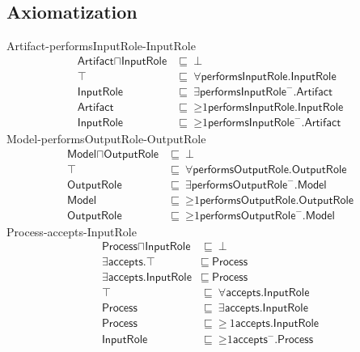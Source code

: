 \subsection{Axiomatization}
\label{axs:1a}
\textsf{Artifact}-\textsf{performsInputRole}-\textsf{InputRole}
\begin{align}
\textsf{Artifact} \sqcap \textsf{InputRole} &\sqsubseteq~\bot \\ %
\textsf{$\top$} &\sqsubseteq~\forall\textsf{performsInputRole.InputRole} \\ %
\textsf{InputRole} &\sqsubseteq~\exists\textsf{performsInputRole}^-\textsf{.Artifact} \\ %
\textsf{Artifact} &\sqsubseteq~\mathord{\geq}1\textsf{performsInputRole.InputRole} \\ %
\textsf{InputRole} &\sqsubseteq~\mathord{\geq}1\textsf{performsInputRole}^-\textsf{.Artifact} %
\end{align}
\textsf{Model}-\textsf{performsOutputRole}-\textsf{OutputRole}
\begin{align}
    \textsf{Model} \sqcap \textsf{OutputRole} &\sqsubseteq~\bot \\ %
    \textsf{$\top$} &\sqsubseteq~\forall\textsf{performsOutputRole.OutputRole} \\ %
    \textsf{OutputRole} &\sqsubseteq~\exists\textsf{performsOutputRole}^-\textsf{.Model} \\ %
    \textsf{Model} &\sqsubseteq~\mathord{\geq}1\textsf{performsOutputRole.OutputRole} \\ %
    \textsf{OutputRole} &\sqsubseteq~\mathord{\geq}1\textsf{performsOutputRole}^-\textsf{.Model} %
\end{align}
\textsf{Process}-\textsf{accepts}-\textsf{InputRole}
\begin{align}
    \textsf{Process} \sqcap \textsf{InputRole} &\sqsubseteq~\bot \\ %
    \exists\textsf{accepts.$\top$} &\sqsubseteq~\textsf{Process} \\ %
    \exists\textsf{accepts.InputRole} &\sqsubseteq~\textsf{Process} \\ %
    \textsf{$\top$} &\sqsubseteq~\forall\textsf{accepts.InputRole} \\ %
    \textsf{Process} &\sqsubseteq~\exists\textsf{accepts.InputRole} \\ %
    \textsf{Process} &\sqsubseteq~\mathord{\geq}~1\textsf{accepts.InputRole} \\ %
    \textsf{InputRole} &\sqsubseteq~\mathord{\geq}1 \textsf{accepts}^-\textsf{.Process} %
\end{align}
